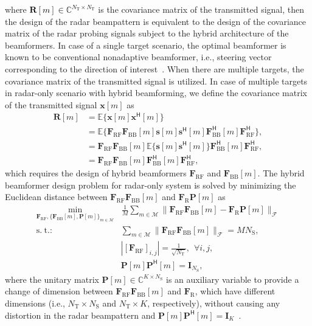 \documentclass[journal,10pt]{IEEEtran}
\DeclareMathOperator*{\minimize}{min} %
\DeclareMathOperator*{\subjectto}{s.\hspace{3pt} t.:\hspace{3pt}} %
\begin{document}
	where 	\textcolor{black}{$\mathbf{R}[m]\in \mathbb{C}^{N_\mathrm{T}\times N_\mathrm{T}}$ }is the covariance matrix of the transmitted signal, then the design of the radar beampattern is equivalent to the design of the covariance matrix of the radar probing signals subject to the hybrid architecture of the beamformers.	In case of a single target scenario, the optimal beamformer is known to be conventional nonadaptive beamformer, i.e., steering vector corresponding to the direction of interest~\cite{phasedArrayMIMOradar}. When there are multiple targets, the covariance matrix of the transmitted signal is utilized.	In case of multiple targets in radar-only scenario with hybrid beamforming, we define the covariance matrix of the transmitted signal {\color{black}$\mathbf{x}[m]$ as
		\begin{align}
		\mathbf{R}[m] &= \mathbb{E}\{\mathbf{x}[m]\mathbf{x}^\textsf{H}[m]  \}\nonumber \\ &= \mathbb{E}\{\mathbf{F}_\mathrm{RF}\mathbf{F}_\mathrm{BB}[m]\mathbf{s}[m]\mathbf{s}^\textsf{H}[m]\mathbf{F}_\mathrm{BB}^\textsf{H}[m]\mathbf{F}_\mathrm{RF}^\textsf{H}  \}, \nonumber \\
		&= \mathbf{F}_\mathrm{RF}\mathbf{F}_\mathrm{BB}[m]\mathbb{E}\{\mathbf{s}[m]\mathbf{s}^\textsf{H}[m]\}\mathbf{F}_\mathrm{BB}^\textsf{H}[m]\mathbf{F}_\mathrm{RF}^\textsf{H},\nonumber\\
		&= \mathbf{F}_\mathrm{RF}\mathbf{F}_\mathrm{BB}[m]\mathbf{F}_\mathrm{BB}^\textsf{H}[m]\mathbf{F}_\mathrm{RF}^\textsf{H},
		\end{align}
		which requires the design of hybrid beamformers $\mathbf{F}_\mathrm{RF}$ and $\mathbf{F}_\mathrm{BB}[m]$. The hybrid beamformer design problem for radar-only system is solved by minimizing the Euclidean distance between $\mathbf{F}_\mathrm{RF}\mathbf{F}_\mathrm{BB}[m]$ and $\mathbf{F}_\mathrm{R}\mathbf{P}[m]$ as
		\begin{align}
		\label{problemRadar1}
		\minimize_{\mathbf{F}_\mathrm{RF},\{\mathbf{F}_\mathrm{BB}[m],\mathbf{P}[m]\}_{m\in \mathcal{M}}} &\hspace{1pt} \frac{1}{M}\sum_{m \in \mathcal{M}}\|\mathbf{F}_\mathrm{RF}\mathbf{F}_\mathrm{BB}[m]  -  \mathbf{F}_\mathrm{R}\mathbf{P}[m]\|_\mathcal{F} \nonumber \\
		\subjectto & \sum_{m \in \mathcal{M}}\| \mathbf{F}_\mathrm{RF}\mathbf{F}_\mathrm{BB}[m] \|_\mathcal{F} = MN_\mathrm{S}, \nonumber \\
		& |[\mathbf{F}_\mathrm{RF}]_{i,j}| = \frac{1}{\sqrt{N_\mathrm{T}}}, \hspace{5pt} \forall i,j, \nonumber \\
		& \mathbf{P}[m]\mathbf{P}^\textsf{H}[m] = \mathbf{I}_{N_\mathrm{S}},
		\end{align}
		where the unitary matrix $\mathbf{P}[m]\in \mathbb{C}^{K\times N_\mathrm{S}}$ is an auxiliary variable to provide a change of dimension between $\mathbf{F}_\mathrm{RF}\mathbf{F}_\mathrm{BB}[m]$ and $\mathbf{F}_\mathrm{R}$, which have different dimensions (i.e., $N_\mathrm{T}\times N_\mathrm{S}$ and $N_\mathrm{T}\times K$, respectively), without causing any distortion in the radar beampattern and $\mathbf{P}[m]\mathbf{P}^\textsf{H}[m] = \mathbf{I}_{K}$~\cite{radarCommLiuICASSP2019}.
	}
	
\end{document}
